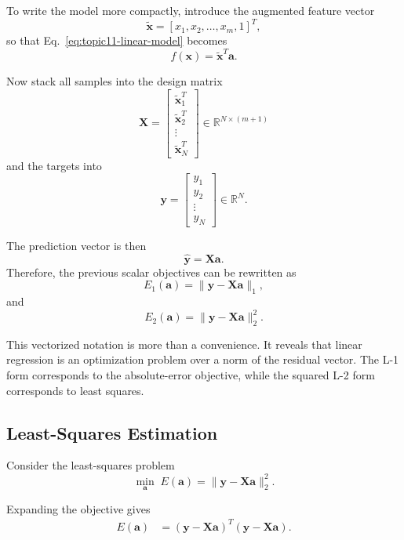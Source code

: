 \documentclass[12pt]{article}
\begin{document}
To write the model more compactly, introduce the augmented feature vector
\[
\tilde{\mathbf{x}} = [x_1, x_2, \ldots, x_m, 1]^T,
\]
so that Eq.~\ref{eq:topic11-linear-model} becomes
\begin{equation}
f(\mathbf{x}) = \tilde{\mathbf{x}}^T\mathbf{a}.
\end{equation}

Now stack all samples into the design matrix
\[
\mathbf{X} =
\begin{bmatrix}
\tilde{\mathbf{x}}_1^T \\
\tilde{\mathbf{x}}_2^T \\
\vdots \\
\tilde{\mathbf{x}}_N^T
\end{bmatrix}
\in \mathbb{R}^{N \times (m+1)}
\]
and the targets into
\[
\mathbf{y} =
\begin{bmatrix}
y_1 \\
y_2 \\
\vdots \\
y_N
\end{bmatrix}
\in \mathbb{R}^{N}.
\]

The prediction vector is then
\[
\hat{\mathbf{y}} = \mathbf{X}\mathbf{a}.
\]
Therefore, the previous scalar objectives can be rewritten as
\begin{equation}
E_1(\mathbf{a}) = \|\mathbf{y} - \mathbf{X}\mathbf{a}\|_1,
\end{equation}
and
\begin{equation}
E_2(\mathbf{a}) = \|\mathbf{y} - \mathbf{X}\mathbf{a}\|_2^2.
\end{equation}

This vectorized notation is more than a convenience. It reveals that linear regression is an optimization problem over a norm of the residual vector. The L-1 form corresponds to the absolute-error objective, while the squared L-2 form corresponds to least squares.

\subsection{Least-Squares Estimation}

Consider the least-squares problem
\begin{equation}
\min_{\mathbf{a}} \; E(\mathbf{a}) = \|\mathbf{y} - \mathbf{X}\mathbf{a}\|_2^2.
\end{equation}

Expanding the objective gives
\begin{equation}
\begin{aligned}
E(\mathbf{a})
&= (\mathbf{y} - \mathbf{X}\mathbf{a})^T(\mathbf{y} - \mathbf{X}\mathbf{a}).
\end{aligned}
\end{equation}
\end{document}
